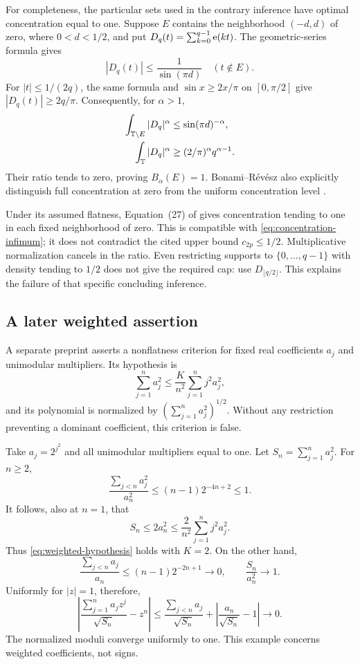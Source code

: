 For completeness, the particular sets used in the contrary inference
have optimal concentration equal to one. Suppose $E$ contains the
neighborhood $(-d,d)$ of zero, where $0<d<1/2$, and put
$D_q(t)=\sum_{k=0}^{q-1}\mathrm e(kt)$. The geometric-series formula gives
\[
 |D_q(t)|\le\frac1{\sin(\pi d)}\quad(t\notin E).
\]
For $|t|\le1/(2q)$, the same formula and
$\sin x\ge2x/\pi$ on $[0,\pi/2]$ give
$|D_q(t)|\ge2q/\pi$. Consequently, for $\alpha>1$,
\begin{align*}
 \int_{\mathbb T\setminus E}|D_q|^\alpha&\le\sin(\pi d)^{-\alpha},\\
 \int_{\mathbb T}|D_q|^\alpha&\ge(2/\pi)^\alpha q^{\alpha-1}.
\end{align*}
Their ratio tends to zero, proving $B_\alpha(E)=1$. Bonami--R\'ev\'esz
also explicitly distinguish full concentration at zero from the uniform
concentration level \cite[Theorem 7 and Proposition 9]{BonamiRevesz2008}.

Under its assumed flatness, Equation~(27) of \cite{ElAbdalaoui2025}
gives concentration tending to
one in each fixed neighborhood of zero. This is compatible with
\eqref{eq:concentration-infimum}; it does not contradict the cited upper
bound $c_{2p}\le1/2$. Multiplicative normalization cancels in the ratio.
Even restricting supports to $\{0,\ldots,q-1\}$ with density tending to
$1/2$ does not give the required cap: use $D_{\lfloor q/2\rfloor}$.
This explains the failure of that specific concluding inference.

\subsection{A later weighted assertion}
A separate preprint \cite[Theorem 1]{ElAbdalaoui2025Generalization}
asserts a nonflatness criterion for fixed real coefficients $a_j$ and
unimodular multipliers. Its hypothesis is
\begin{equation}\label{eq:weighted-hypothesis}
 \sum_{j=1}^n a_j^2\le\frac K{n^2}\sum_{j=1}^n j^2a_j^2,
\end{equation}
and its polynomial is normalized by $(\sum_{j=1}^n a_j^2)^{1/2}$.
Without any restriction preventing a dominant coefficient, this
criterion is false.

Take $a_j=2^{j^2}$ and all unimodular multipliers equal to one. Let
$S_n=\sum_{j=1}^n a_j^2$. For $n\ge2$,
\[
 \frac{\sum_{j<n}a_j^2}{a_n^2}
 \le(n-1)2^{-4n+2}\le1.
\]
It follows, also at $n=1$, that
\[
 S_n\le2a_n^2\le\frac2{n^2}\sum_{j=1}^n j^2a_j^2.
\]
Thus \eqref{eq:weighted-hypothesis} holds with $K=2$. On the other hand,
\[
 \frac{\sum_{j<n}a_j}{a_n}\le(n-1)2^{-2n+1}\longrightarrow0,
 \qquad \frac{S_n}{a_n^2}\longrightarrow1.
\]
Uniformly for $|z|=1$, therefore,
\[
 \left|\frac{\sum_{j=1}^n a_jz^j}{\sqrt{S_n}}-z^n\right|
 \le\frac{\sum_{j<n}a_j}{\sqrt{S_n}}
       +\left|\frac{a_n}{\sqrt{S_n}}-1\right|\longrightarrow0.
\]
The normalized moduli converge uniformly to one. This example concerns
weighted coefficients, not signs.

